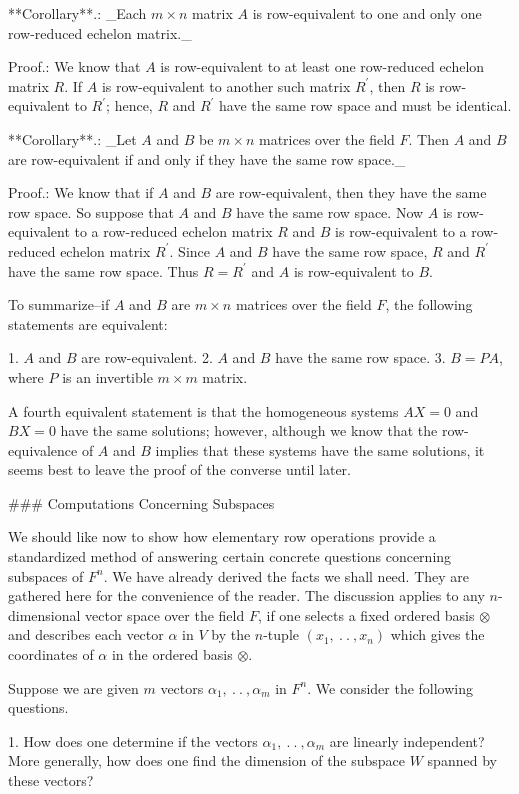 

**Corollary**.: _Each \(m\times n\) matrix \(A\) is row-equivalent to one and only one row-reduced echelon matrix._

Proof.: We know that \(A\) is row-equivalent to at least one row-reduced echelon matrix \(R\). If \(A\) is row-equivalent to another such matrix \(R^{\prime}\), then \(R\) is row-equivalent to \(R^{\prime}\); hence, \(R\) and \(R^{\prime}\) have the same row space and must be identical.

**Corollary**.: _Let \(A\) and \(B\) be \(m\times n\) matrices over the field \(F\). Then \(A\) and \(B\) are row-equivalent if and only if they have the same row space._

Proof.: We know that if \(A\) and \(B\) are row-equivalent, then they have the same row space. So suppose that \(A\) and \(B\) have the same row space. Now \(A\) is row-equivalent to a row-reduced echelon matrix \(R\) and \(B\) is row-equivalent to a row-reduced echelon matrix \(R^{\prime}\). Since \(A\) and \(B\) have the same row space, \(R\) and \(R^{\prime}\) have the same row space. Thus \(R=R^{\prime}\) and \(A\) is row-equivalent to \(B\).

To summarize--if \(A\) and \(B\) are \(m\times n\) matrices over the field \(F\), the following statements are equivalent:

1. \(A\) and \(B\) are row-equivalent.
2. \(A\) and \(B\) have the same row space.
3. \(B=PA\), where \(P\) is an invertible \(m\times m\) matrix.

A fourth equivalent statement is that the homogeneous systems \(AX=0\) and \(BX=0\) have the same solutions; however, although we know that the row-equivalence of \(A\) and \(B\) implies that these systems have the same solutions, it seems best to leave the proof of the converse until later.

### Computations Concerning Subspaces

We should like now to show how elementary row operations provide a standardized method of answering certain concrete questions concerning subspaces of \(F^{n}\). We have already derived the facts we shall need. They are gathered here for the convenience of the reader. The discussion applies to any \(n\)-dimensional vector space over the field \(F\), if one selects a fixed ordered basis \(\otimes\) and describes each vector \(\alpha\) in \(V\) by the \(n\)-tuple \((x_{1},\ .\ .\ ,x_{n})\) which gives the coordinates of \(\alpha\) in the ordered basis \(\otimes\).

Suppose we are given \(m\) vectors \(\alpha_{1},\ .\ .\ ,\alpha_{m}\) in \(F^{n}\). We consider the following questions.

1. How does one determine if the vectors \(\alpha_{1},\ .\ .\ ,\alpha_{m}\) are linearly independent? More generally, how does one find the dimension of the subspace \(W\) spanned by these vectors?